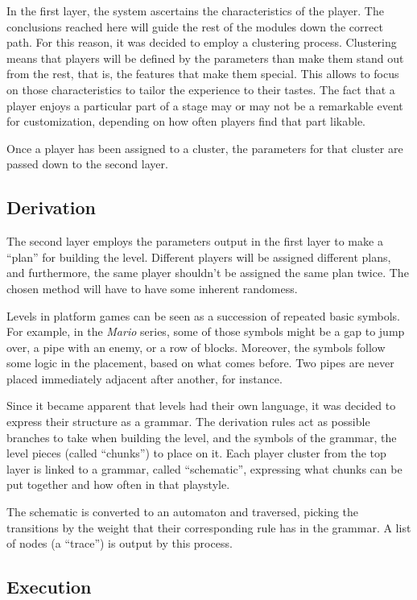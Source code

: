 \documentclass[conference]{IEEEtran}
\begin{document}
In the first layer, the system ascertains the characteristics of the player. The conclusions reached here will guide the rest of the modules down the correct path. For this reason, it was decided to employ a clustering process. Clustering means that players will be defined by the parameters than make them stand out from the rest, that is, the features that make them special. This allows to focus on those characteristics to tailor the experience to their tastes. The fact that a player enjoys a particular part of a stage may or may not be a remarkable event for customization, depending on how often players find that part likable.

Once a player has been assigned to a cluster, the parameters for that cluster are passed down to the second layer.

\subsection{Derivation}

The second layer employs the parameters output in the first layer to make a ``plan'' for building the level. Different players will be assigned different plans, and furthermore, the same player shouldn't be assigned the same plan twice. The chosen method will have to have some inherent randomess.

Levels in platform games can be seen as a succession of repeated basic symbols. For example, in the \textit{Mario} series, some of those symbols might be a gap to jump over, a pipe with an enemy, or a row of blocks. Moreover, the symbols follow some logic in the placement, based on what comes before. Two pipes are never placed immediately adjacent after another, for instance.

Since it became apparent that levels had their own language, it was decided to express their structure as a grammar. The derivation rules act as possible branches to take when building the level, and the symbols of the grammar, the level pieces (called ``chunks'') to place on it. Each player cluster from the top layer is linked to a grammar, called ``schematic'', expressing what chunks can be put together and how often in that playstyle. 

The schematic is converted to an automaton and traversed, picking the transitions by the weight that their corresponding rule has in the grammar. A list of nodes (a ``trace'') is output by this process.

\subsection{Execution}
\end{document}
